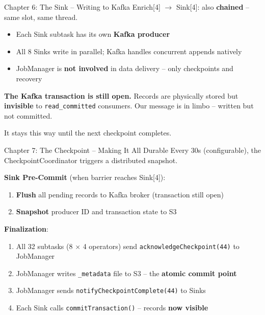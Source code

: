\documentclass[aspectratio=169]{beamer}
\begin{document}
\begin{frame}{Chapter 6: The Sink -- Writing to Kafka}
    Enrich[4] $\rightarrow$ Sink[4]: also \textbf{chained} -- same slot, same thread.

    \vspace{0.3cm}
    \begin{itemize}
        \item Each Sink subtask has its own \textbf{Kafka producer}
        \item All 8 Sinks write in parallel; Kafka handles concurrent appends natively
        \item JobManager is \textbf{not involved} in data delivery -- only checkpoints and recovery
    \end{itemize}

    \vspace{0.3cm}
    \colorbox{utu_pink!20}{\parbox{0.9\textwidth}{
        \centering
        \textbf{The Kafka transaction is still open.} Records are physically stored but \textbf{invisible} to \texttt{read\_committed} consumers. Our message is in limbo -- written but not committed.
    }}

    \vspace{0.2cm}
    \begin{center}
        It stays this way until the next checkpoint completes.
    \end{center}
\end{frame}


\begin{frame}{Chapter 7: The Checkpoint -- Making It All Durable}
    Every 30s (configurable), the CheckpointCoordinator triggers a distributed snapshot.

    \vspace{0.3cm}
    \textbf{Sink Pre-Commit} (when barrier reaches Sink[4]):
    \begin{enumerate}
        \item \textbf{Flush} all pending records to Kafka broker (transaction still open)
        \item \textbf{Snapshot} producer ID and transaction state to S3
    \end{enumerate}

    \vspace{0.2cm}
    \textbf{Finalization}:
    \begin{enumerate}
        \item All 32 subtasks (8 $\times$ 4 operators) send \texttt{acknowledgeCheckpoint(44)} to JobManager
        \item JobManager writes \texttt{\_metadata} file to S3 -- the \textbf{atomic commit point}
        \item JobManager sends \texttt{notifyCheckpointComplete(44)} to Sinks
        \item Each Sink calls \texttt{commitTransaction()} -- records \textbf{now visible}
    \end{enumerate}
\end{frame}
\end{document}
